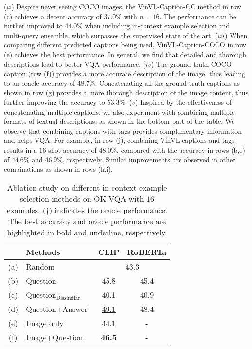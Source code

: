 ($ii$) Despite never seeing COCO images, the VinVL-Caption-CC method in row (c) achieves a decent accuracy of $37.0\%$ with $n=16$. The performance can be further improved to $44.0\%$ when including in-context example selection and multi-query ensemble, which surpasses the supervised state of the art.
($iii$) When comparing different predicted captions being used, VinVL-Caption-COCO in row (e) achieves the best performance. In general, we find that detailed and thorough descriptions lead to better VQA performance.
($iv$) The ground-truth COCO caption (row (f)) provides a more accurate description of the image, thus leading to an oracle accuracy of $48.7\%$. Concatenating all the ground-truth captions as shown in row (g) provides a more thorough description of the image content, thus further improving the accuracy to $53.3\%$.
($v$) Inspired by the effectiveness of concatenating multiple captions, we also experiment with combining multiple formats of textual descriptions, as shown in the bottom part of the table. We observe that combining captions with tags provides complementary information and helps VQA. For example, in row (j), combining VinVL captions and tags results in a $16$-shot accuracy of $48.0\%$, compared with the accuracy in rows (b,e) of $44.6\%$ and $46.9\%$, respectively. Similar improvements are observed in other combinations as shown in rows (h,i).

\begin{table}[t]
\small \centering
\begin{tabular}{ c l || c c }
    \hline
    & Methods & CLIP & RoBERTa \\
    \hline
    (a) & Random & \multicolumn{2}{c}{43.3}  \\
    (b) & Question & 45.8 & 45.4 \\
    (c) & Question$_\text{Dissimilar}$ & 40.1 & 40.9 \\
    (d) & Question+Answer$^\dagger$ & \underline{49.1} & 48.4 \\
    \hline
    (e) & Image only & 44.1 & - \\
    (f) & Image+Question & \textbf{46.5} & - \\
    \hline\end{tabular}
\vspace{-2mm}
\caption{\small Ablation study on different in-context example selection methods on OK-VQA with $16$ examples. ($\dagger$) indicates the oracle performance. The best accuracy and oracle performance are highlighted in bold and underline, respectively.}
\label{table:qaselect}
\vspace{-2mm}
\end{table}


